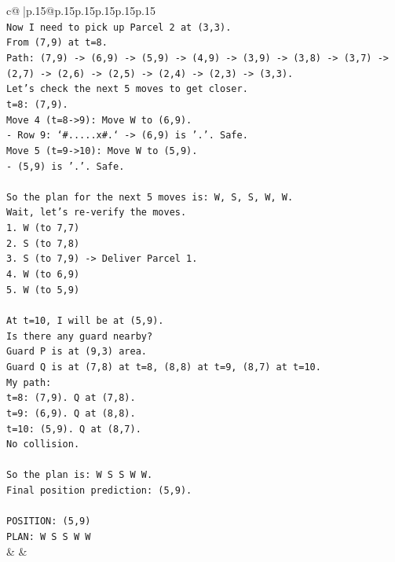 \documentclass{article}
\begin{document}
{\begin{supertabular}{c@{$\;$}|p{.15\linewidth}@{}p{.15\linewidth}p{.15\linewidth}p{.15\linewidth}p{.15\linewidth}p{.15\linewidth}}
{{{\\ 
\texttt{Now I need to pick up Parcel 2 at (3,3).} \\
\texttt{From (7,9) at t=8.} \\
\texttt{Path: (7,9) {-}> (6,9) {-}> (5,9) {-}> (4,9) {-}> (3,9) {-}> (3,8) {-}> (3,7) {-}> (2,7) {-}> (2,6) {-}> (2,5) {-}> (2,4) {-}> (2,3) {-}> (3,3).} \\
\texttt{Let's check the next 5 moves to get closer.} \\
\texttt{t=8: (7,9).} \\
\texttt{Move 4 (t=8{-}>9): Move W to (6,9).} \\
\texttt{{-} Row 9: `\#.....x\#.` {-}> (6,9) is '.'. Safe.} \\
\texttt{Move 5 (t=9{-}>10): Move W to (5,9).} \\
\texttt{{-} (5,9) is '.'. Safe.} \\
\\ 
\texttt{So the plan for the next 5 moves is: W, S, S, W, W.} \\
\texttt{Wait, let's re{-}verify the moves.} \\
\texttt{1. W (to 7,7)} \\
\texttt{2. S (to 7,8)} \\
\texttt{3. S (to 7,9) {-}> Deliver Parcel 1.} \\
\texttt{4. W (to 6,9)} \\
\texttt{5. W (to 5,9)} \\
\\ 
\texttt{At t=10, I will be at (5,9).} \\
\texttt{Is there any guard nearby?} \\
\texttt{Guard P is at (9,3) area.} \\
\texttt{Guard Q is at (7,8) at t=8, (8,8) at t=9, (8,7) at t=10.} \\
\texttt{My path:} \\
\texttt{t=8: (7,9). Q at (7,8).} \\
\texttt{t=9: (6,9). Q at (8,8).} \\
\texttt{t=10: (5,9). Q at (8,7).} \\
\texttt{No collision.} \\
\\ 
\texttt{So the plan is: W S S W W.} \\
\texttt{Final position prediction: (5,9).} \\
\\ 
\texttt{POSITION: (5,9)} \\
\texttt{PLAN: W S S W W} \\
            }
        }
    }
    & & \\ \\


\end{supertabular}}
\end{document}
